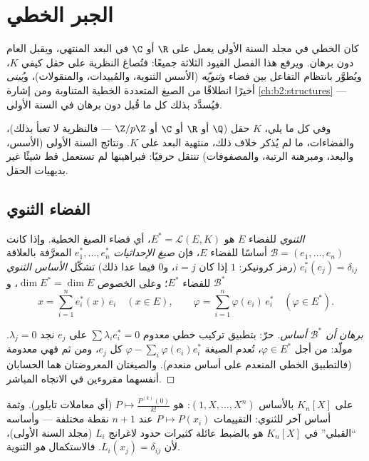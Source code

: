 \chapter{الجبر الخطي}\label{ch:b2:linalg}

كان  الخطي في مجلد السنة الأولى يعمل على $\R$ أو $\C$ في
البعد المنتهي، ويقبل  العام دون برهان. ويرفع هذا الفصل
القيود الثلاثة جميعًا: فتُصاغ النظرية على حقل كيفي $K$،
ويُطوَّر بانتظام التفاعل بين فضاء و\emph{ثنويّه}
(الأسس الثنوية، والمُبيدات، والمنقولات)، و\emph{يُبنى}  أخيرًا
انطلاقًا من الصيغ المتعددة الخطية المتناوبة ومن إشارة
\cref{ch:b2:structures} --- فيُسدَّد بذلك كل ما قُبل دون برهان في السنة الأولى.

وفي كل ما يلي، $K$ حقل ($\Q$ أو $\R$ أو $\C$ أو $\Z/p\Z$ --- فالنظرية
لا تعبأ بذلك)، والفضاءات، ما لم يُذكر خلاف ذلك، منتهية البعد
على $K$. ونتائج السنة الأولى (الأسس، والبعد،
ومبرهنة الرتبة، والمصفوفات) تنتقل حرفيًا: فبراهينها لم تستعمل قط
شيئًا غير بديهيات الحقل.

\section{الفضاء الثنوي}

\begin{definition}\label{def:b2:linalg:dual}
\emph{الثنوي} للفضاء $E$ هو $E^* = \mathcal{L}(E,
K)$، أي فضاء الصيغ الخطية. وإذا كانت $\mathcal{B} = (e_1, \dots, e_n)$
أساسًا للفضاء $E$، فإن \emph{صيغ الإحداثيات} $e_1^*, \dots, e_n^*$
المعرَّفة بالعلاقة $e_i^*(e_j) = \delta_{ij}$ (رمز كرونيكر: $1$ إذا كان $i = j$،
و$0$ فيما عدا ذلك) تشكّل \emph{الأساس الثنوي}
$\mathcal{B}^*$ للفضاء $E^*$؛ وعلى الخصوص $\dim E^* = \dim E$، و
\[
x = \sum_{i=1}^{n} e_i^*(x)\, e_i \quad (x \in E),
\qquad
\varphi = \sum_{i=1}^{n} \varphi(e_i)\, e_i^* \quad (\varphi \in
E^*).
\]
\end{definition}

\begin{proof}[برهان أن $\mathcal{B}^*$ أساس]
حرّ: بتطبيق تركيب خطي معدوم $\sum \lambda_i e_i^* = 0$ على
$e_j$ نجد $\lambda_j = 0$. مولّد: من أجل $\varphi \in E^*$، تُعدم
الصيغة $\varphi - \sum_i \varphi(e_i) e_i^*$ كل $e_j$، ومن ثم فهي معدومة
(فالتطبيق الخطي المنعدم على أساس منعدم). والصيغتان
المعروضتان هما الحسابان أنفسهما مقروءين في الاتجاه المباشر.
\end{proof}

\begin{example}\label{ex:b2:linalg:dualexamples}
على $K_n[X]$ بالأساس $(1, X, \dots, X^n)$:  هو $P
\mapsto \frac{P^{(k)}(0)}{k!}$ (أي معاملات تايلور). وثمة أساس آخر
للثنوي: التقييمات $P \mapsto P(x_i)$ عند $n + 1$ نقطة مختلفة --- وأساسه
``القبلي'' في $K_n[X]$ هو بالضبط عائلة
كثيرات حدود لاغرانج $L_i$ (مجلد السنة الأولى)، لأن $L_i(x_j) =
\delta_{ij}$. فالاستكمال \emph{هو} الثنوية.
\end{example}

